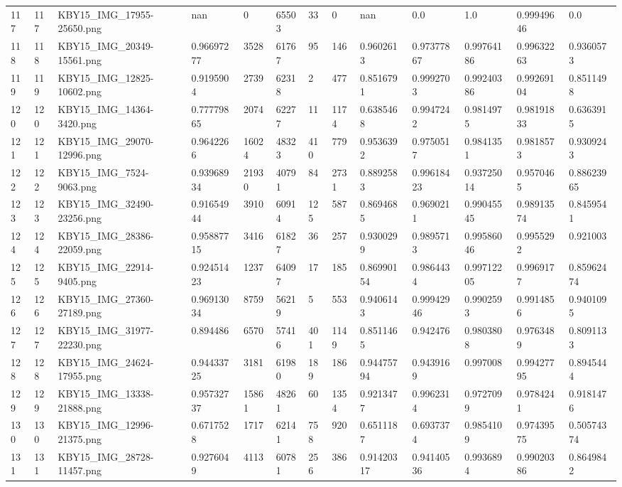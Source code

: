 \documentclass[11pt, a4paper, twoside]{report}
\begin{document}
\begin{longtable}[c]{@{}lllllllllllll@{}}
117 & 117 & KBY15\_IMG\_17955-25650.png & nan & 0 & 65503 & 33 & 0 & nan & 0.0 & 1.0 & 0.99949646 & 0.0 \\
118 & 118 & KBY15\_IMG\_20349-15561.png & 0.96697277 & 3528 & 61767 & 95 & 146 & 0.9602613 & 0.97377867 & 0.99764186 & 0.99632263 & 0.9360573 \\
119 & 119 & KBY15\_IMG\_12825-10602.png & 0.9195904 & 2739 & 62318 & 2 & 477 & 0.8516791 & 0.9992703 & 0.99240386 & 0.99269104 & 0.8511498 \\
120 & 120 & KBY15\_IMG\_14364-3420.png & 0.77779865 & 2074 & 62277 & 11 & 1174 & 0.6385468 & 0.9947242 & 0.9814975 & 0.98191833 & 0.6363915 \\
121 & 121 & KBY15\_IMG\_29070-12996.png & 0.9642266 & 16024 & 48323 & 410 & 779 & 0.9536392 & 0.9750517 & 0.9841351 & 0.9818573 & 0.9309243 \\
122 & 122 & KBY15\_IMG\_7524-9063.png & 0.93968934 & 21930 & 40791 & 84 & 2731 & 0.8892583 & 0.99618423 & 0.93725014 & 0.9570465 & 0.88623965 \\
123 & 123 & KBY15\_IMG\_32490-23256.png & 0.91654944 & 3910 & 60914 & 125 & 587 & 0.8694685 & 0.9690211 & 0.99045545 & 0.98913574 & 0.8459541 \\
124 & 124 & KBY15\_IMG\_28386-22059.png & 0.95887715 & 3416 & 61827 & 36 & 257 & 0.9300299 & 0.9895713 & 0.99586046 & 0.9955292 & 0.921003 \\
125 & 125 & KBY15\_IMG\_22914-9405.png & 0.92451423 & 1237 & 64097 & 17 & 185 & 0.86990154 & 0.9864434 & 0.99712205 & 0.9969177 & 0.85962474 \\
126 & 126 & KBY15\_IMG\_27360-27189.png & 0.96913034 & 8759 & 56219 & 5 & 553 & 0.9406143 & 0.99942946 & 0.9902593 & 0.9914856 & 0.9401095 \\
127 & 127 & KBY15\_IMG\_31977-22230.png & 0.894486 & 6570 & 57416 & 401 & 1149 & 0.8511465 & 0.942476 & 0.9803808 & 0.9763489 & 0.8091133 \\
128 & 128 & KBY15\_IMG\_24624-17955.png & 0.94433725 & 3181 & 61980 & 189 & 186 & 0.94475794 & 0.9439169 & 0.997008 & 0.99427795 & 0.8945444 \\
129 & 129 & KBY15\_IMG\_13338-21888.png & 0.95732737 & 15861 & 48261 & 60 & 1354 & 0.9213477 & 0.9962314 & 0.9727099 & 0.9784241 & 0.9181476 \\
130 & 130 & KBY15\_IMG\_12996-21375.png & 0.6717528 & 1717 & 62141 & 758 & 920 & 0.6511187 & 0.6937374 & 0.9854109 & 0.97439575 & 0.50574374 \\
131 & 131 & KBY15\_IMG\_28728-11457.png & 0.9276049 & 4113 & 60781 & 256 & 386 & 0.91420317 & 0.94140536 & 0.9936894 & 0.99020386 & 0.8649842 \\

\end{longtable}
\end{document}
